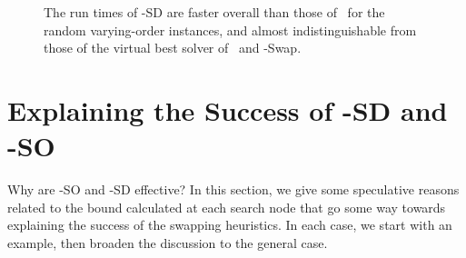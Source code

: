 \begin{figure}[h!]
    \centering
    \caption{The run times of \McSplit-SD are faster overall than those of \McSplit\ for the
        random varying-order instances, and almost indistinguishable from those of the virtual
        best solver of \McSplit\ and \McSplit-Swap.}
        \label{figure:left-vs-smart-o-mcis}
\end{figure}

\section{Explaining the Success of \McSplit-SD and \McSplit-SO}\label{sec:explaining-sd-so}

Why are \McSplit-SO and \McSplit-SD effective?  In this section, we give some
speculative reasons related to the bound calculated at each search node that go
some way towards explaining the success of the swapping heuristics.  In each
case, we start with an example, then broaden the discussion to the general
case.

